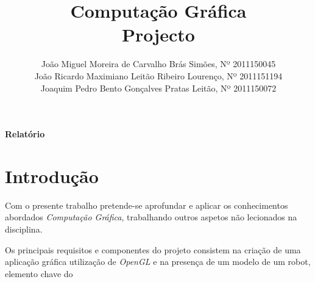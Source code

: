 \documentclass[11pt,a4paper]{article}
\title{\bf{Computação Gráfica}\vspace{50mm}\\Projecto\vspace{80mm}}
\author{
João Miguel Moreira de Carvalho Brás Simões, Nº 2011150045\\
João Ricardo Maximiano Leitão Ribeiro Lourenço, Nº 2011151194\\
Joaquim Pedro Bento Gonçalves Pratas Leitão, Nº 2011150072}
\begin{document}
\maketitle
\centerline{\textbf{Relatório}}
\pagebreak

\printindex

\pagebreak

\section{Introdução}

Com o presente trabalho pretende-se aprofundar e aplicar os conhecimentos abordados \emph{Computação Gráfica}, trabalhando outros aspetos não lecionados na disciplina.

Os principais requisitos e componentes do projeto consistem na criação de uma aplicação gráfica utilização de \emph{OpenGL} e na presença de um modelo de um robot, elemento chave do 
\end{document}
